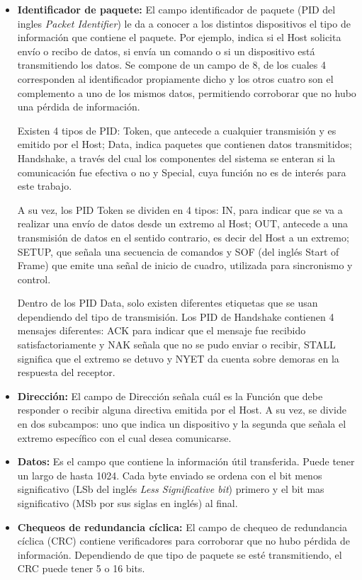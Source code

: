 	\begin{itemize}

	\item {\bf Identificador de paquete:}
		El campo identificador de paquete (PID del ingles {\it Packet Identifier}) le da a conocer a los distintos dispositivos el tipo de información que contiene el paquete. Por ejemplo, indica si el Host solicita envío o recibo de datos, si envía un comando o si un dispositivo está transmitiendo los datos. Se compone de un campo de \SI{8}{\bit}, de los cuales 4 corresponden al identificador propiamente dicho y los otros cuatro son el complemento a uno de los mismos datos, permitiendo corroborar que no hubo una pérdida de información.%
		
		Existen 4 tipos de PID: Token, que antecede a cualquier transmisión y es emitido por el Host; Data, indica paquetes que contienen datos transmitidos; Handshake, a través del cual los componentes del sistema se enteran si la comunicación fue efectiva o no y Special, cuya función no es de interés para este trabajo.%
	
		A su vez, los PID Token se dividen en 4 tipos: IN, para indicar que se va a realizar una envío de datos desde un extremo al Host; OUT, antecede a una transmisión de datos en el sentido contrario, es decir del Host a un extremo; SETUP, que señala una secuencia de comandos y SOF (del inglés {Start of Frame)} que emite una señal de inicio de cuadro, utilizada para sincronismo y control.%
	
		Dentro de los PID Data, solo existen diferentes etiquetas que se usan dependiendo del tipo de transmisión. Los PID de Handshake contienen 4 mensajes diferentes: ACK para indicar que el mensaje fue recibido satisfactoriamente y NAK señala que no se pudo enviar o recibir, STALL significa que el extremo se detuvo y NYET da cuenta sobre demoras en la respuesta del receptor.
	
	\item{\bf Dirección:}
		El campo de Dirección señala cuál es la Función que debe responder o recibir alguna directiva emitida por el Host. A su vez, se divide en dos subcampos: uno que indica un dispositivo y la segunda que señala el extremo específico con el cual desea comunicarse.

	\item{\bf Datos:}
		Es el campo que contiene la información útil transferida. Puede tener un largo de hasta \SI{1024}{\byte}. Cada byte enviado se ordena con el bit menos significativo (LSb del inglés {\it Less Significative bit}) primero y el bit mas significativo (MSb por sus siglas en inglés) al final.

	\item{\bf Chequeos de redundancia cíclica:}
		El campo de chequeo de redundancia cíclica (CRC) contiene verificadores para corroborar que no hubo pérdida de información. Dependiendo de que tipo de paquete se esté transmitiendo, el CRC puede tener 5 o 16 bits. 
	\end{itemize}
